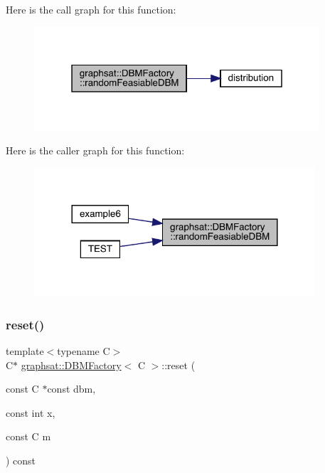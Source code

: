 Here is the call graph for this function\+:
\nopagebreak
\begin{figure}[H]
\begin{center}
\leavevmode
\includegraphics[width=301pt]{classgraphsat_1_1_d_b_m_factory_a900f72a3876daf4cd4142a3704873025_cgraph}
\end{center}
\end{figure}
Here is the caller graph for this function\+:
\nopagebreak
\begin{figure}[H]
\begin{center}
\leavevmode
\includegraphics[width=296pt]{classgraphsat_1_1_d_b_m_factory_a900f72a3876daf4cd4142a3704873025_icgraph}
\end{center}
\end{figure}
\mbox{\label{classgraphsat_1_1_d_b_m_factory_aecc4c6f42165cbce7cc7465e4558846e}} 
\subsubsection{\texorpdfstring{reset()}{reset()}}
{\footnotesize\ttfamily template$<$typename C$>$ \\
C$\ast$ \mbox{\hyperlink{classgraphsat_1_1_d_b_m_factory}{graphsat\+::\+D\+B\+M\+Factory}}$<$ C $>$\+::reset (\begin{DoxyParamCaption}\item[{const C $\ast$const}]{dbm,  }\item[{const int}]{x,  }\item[{const C}]{m }\end{DoxyParamCaption}) const\hspace{0.3cm}{\ttfamily [inline]}}

